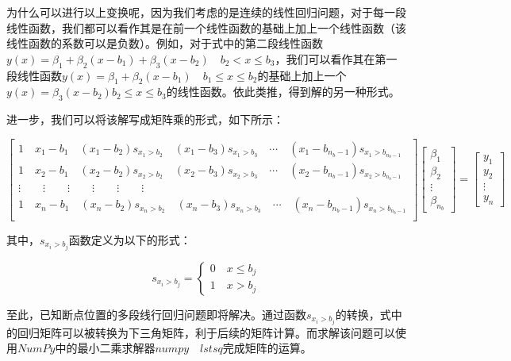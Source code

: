 为什么可以进行以上变换呢，因为我们考虑的是连续的线性回归问题，对于每一段线性函数，我们都可以看作其是在前一个线性函数的基础上加上一个线性函数（该线性函数的系数可以是负数）。例如，对于式中的第二段线性函数$y(x)=\beta_1 + \beta_2(x-b_1) + \beta_3(x-b_2) \quad b_2 < x \leq b_3$，我们可以看作其在第一段线性函数$y(x)=\beta_1 + \beta_2(x-b_1) \quad b_1 \leq x \leq b_2$的基础上加上一个$y(x)=\beta _3(x-b_2) b_2 \leq x \leq b_3$的线性函数。依此类推，得到解的另一种形式。

进一步，我们可以将该解写成矩阵乘的形式，如下所示：

\[\begin{bmatrix}
    1 \quad x_1-b_1 \quad (x_1-b_2)s_{x_1 > b_2} \quad (x_1-b_3)s_{x_1 > b_3} \quad \cdots \quad (x_1-b_{n_b-1})s_{x_1 > b_{n_b-1}} \\
    1 \quad x_2-b_1 \quad (x_2-b_2)s_{x_2 > b_2} \quad (x_2-b_3)s_{x_2 > b_3} \quad \cdots \quad (x_2-b_{n_b-1})s_{x_2 > b_{n_b-1}} \\
    \vdots \quad \quad \vdots \quad\quad \vdots \quad\quad \vdots \quad \quad \vdots \quad \quad \vdots \\
    1 \quad x_n-b_1 \quad (x_n-b_2)s_{x_n > b_2} \quad (x_n-b_3)s_{x_n > b_3} \quad \cdots \quad (x_n-b_{n_b-1})s_{x_n > b_{n_b-1}} \\
    \end{bmatrix} \begin{bmatrix}
    \beta_1 \\
    \beta_2 \\
    \vdots \\
    \beta_{n_b}
    \end{bmatrix} = \begin{bmatrix}
    y_1 \\
    y_2 \\
    \vdots \\
    y_n
    \end{bmatrix}\]

其中，$s_{x_i > b_j}$函数定义为以下的形式：

\[s_{x_i > b_j} = \begin{cases}
    0 \quad x \leq b_j \\
    1 \quad x > b_j    
\end{cases}\]

至此，已知断点位置的多段线行回归问题即将解决。通过函数$s_{x_i > b_j}$的转换，式中的回归矩阵可以被转换为下三角矩阵，利于后续的矩阵计算。而求解该问题可以使用$NumPy$中的最小二乘求解器$numpy\quad lstsq$完成矩阵的运算\cite{ref6}。

